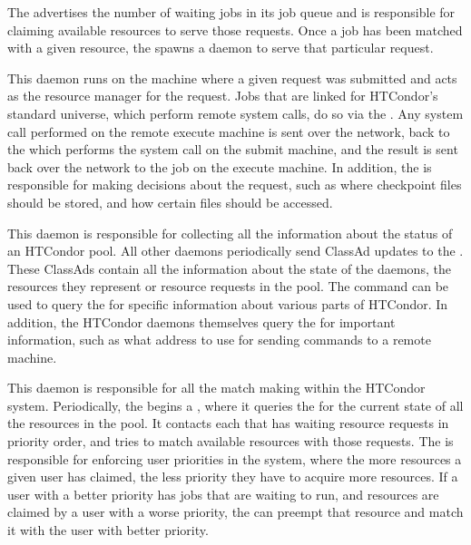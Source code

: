 \begin{description}
The  advertises the number of waiting jobs in its job queue and
is responsible for claiming available resources to serve those requests.  
Once a job has been matched with a given resource, the
 spawns a  daemon to serve that
particular request.

\item[\Condor{shadow}] This daemon
runs on the machine where a given
request was submitted and acts as the resource manager for the
request.  Jobs that are linked for HTCondor's standard universe, which
perform remote system calls, do so via the .  Any
system call performed on the remote execute machine is sent over the
network, back to the  which performs the
system call on the submit machine, and the result
is sent back over the network to the job on the execute machine.
In addition, 
the  is responsible for making decisions about the request,
such as where checkpoint files should be stored, 
and how certain files should be accessed.  

\item[\Condor{collector}] This daemon
is responsible for collecting
all the information about the status of an HTCondor pool.  All other
daemons periodically send ClassAd updates to
the .  These ClassAds contain all the information about the
state of the daemons, the resources they represent or resource
requests in the pool.
The  command can be used to query the
 for specific information about various parts of HTCondor.  
In addition, the HTCondor daemons themselves query the  for
important information, such as what address to use for sending
commands to a remote machine. 

\item[\Condor{negotiator}] This daemon
is responsible for all the match making within the HTCondor system.  
Periodically, the 
begins a , where it queries the 
 for
the current state of all the resources in the pool.  It contacts each
 that has waiting resource requests in priority order, 
and tries to match available resources with those requests.
The  is
responsible for enforcing user priorities in the system, where the
more resources a given user has claimed, the less priority they have
to acquire more resources.  If a user with a better priority has jobs
that are waiting to run, and resources are claimed by a user with a
worse priority, the  can preempt that resource and match it
with the user with better priority.


\end{description}
